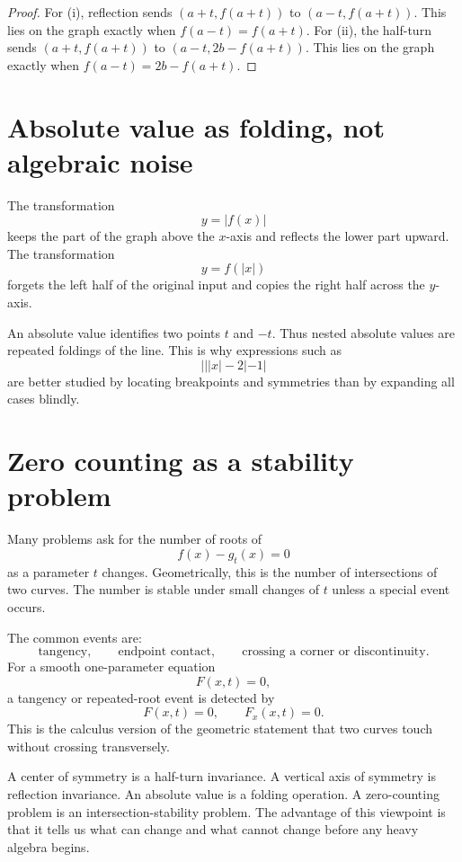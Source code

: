 \begin{proof}
For (i), reflection sends \((a+t,f(a+t))\) to \((a-t,f(a+t))\).  This lies on the graph exactly when \(f(a-t)=f(a+t)\).  For (ii), the half-turn sends \((a+t,f(a+t))\) to \((a-t,2b-f(a+t))\).  This lies on the graph exactly when \(f(a-t)=2b-f(a+t)\).
\end{proof}

\section{Absolute value as folding, not algebraic noise}

The transformation
\[
  y=|f(x)|
\]
keeps the part of the graph above the \(x\)-axis and reflects the lower part upward.  The transformation
\[
  y=f(|x|)
\]
forgets the left half of the original input and copies the right half across the \(y\)-axis.

\begin{remark}
An absolute value identifies two points \(t\) and \(-t\).  Thus nested absolute values are repeated foldings of the line.  This is why expressions such as
\[
  |||x|-2|-1|
\]
are better studied by locating breakpoints and symmetries than by expanding all cases blindly.
\end{remark}

\section{Zero counting as a stability problem}

Many problems ask for the number of roots of
\[
  f(x)-g_t(x)=0
\]
as a parameter \(t\) changes.  Geometrically, this is the number of intersections of two curves.  The number is stable under small changes of \(t\) unless a special event occurs.

The common events are:
\[
  \text{tangency},\qquad
  \text{endpoint contact},\qquad
  \text{crossing a corner or discontinuity}.
\]
For a smooth one-parameter equation
\[
  F(x,t)=0,
\]
a tangency or repeated-root event is detected by
\[
  F(x,t)=0,\qquad F_x(x,t)=0.
\]
This is the calculus version of the geometric statement that two curves touch without crossing transversely.

\begin{remark}
A center of symmetry is a half-turn invariance.  A vertical axis of symmetry is reflection invariance.  An absolute value is a folding operation.  A zero-counting problem is an intersection-stability problem.  The advantage of this viewpoint is that it tells us what can change and what cannot change before any heavy algebra begins.
\end{remark}
